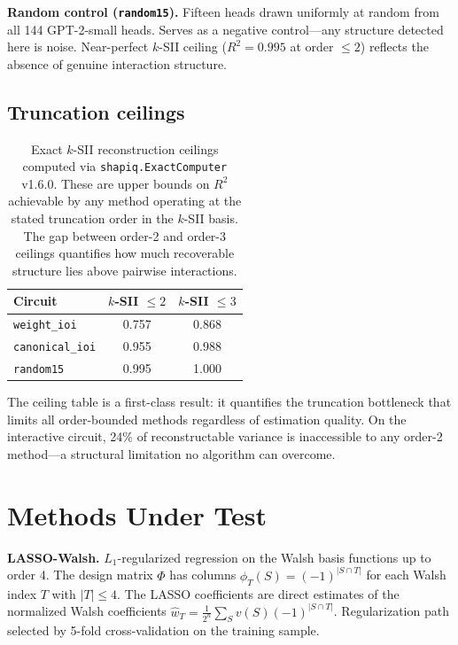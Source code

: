 \documentclass[11pt]{article}
\begin{document}
\textbf{Random control (\texttt{random15}).}
Fifteen heads drawn uniformly at random from all 144 GPT-2-small heads.
Serves as a negative control---any structure detected here is noise.
Near-perfect $k$-SII ceiling ($R^2 = 0.995$ at order $\leq 2$) reflects
the absence of genuine interaction structure.

\subsection{Truncation ceilings}
\label{sec:ceilings}

\begin{table}[t]
\centering
\caption{Exact $k$-SII reconstruction ceilings computed via
\texttt{shapiq.ExactComputer} v1.6.0. These are upper bounds on $R^2$
achievable by any method operating at the stated truncation order in the
$k$-SII basis. The gap between order-2 and order-3 ceilings quantifies
how much recoverable structure lies above pairwise interactions.}
\label{tab:ceilings}
\begin{tabular}{lcc}
\toprule
Circuit & $k$-SII $\leq 2$ & $k$-SII $\leq 3$ \\
\midrule
\texttt{weight\_ioi} & 0.757 & 0.868 \\
\texttt{canonical\_ioi} & 0.955 & 0.988 \\
\texttt{random15} & 0.995 & 1.000 \\
\bottomrule
\end{tabular}
\end{table}

The ceiling table is a first-class result: it quantifies the truncation
bottleneck that limits all order-bounded methods regardless of estimation
quality. On the interactive circuit, 24\% of reconstructable variance
is inaccessible to any order-2 method---a structural limitation no
algorithm can overcome.


\section{Methods Under Test}
\label{sec:methods}


\textbf{LASSO-Walsh.}
$L_1$-regularized regression on the Walsh basis functions up to order 4.
The design matrix $\Phi$ has columns $\phi_T(S) = (-1)^{|S \cap T|}$
for each Walsh index $T$ with $|T| \leq 4$. The LASSO coefficients are
direct estimates of the normalized Walsh coefficients
$\hat{w}_T = \frac{1}{2^n} \sum_S v(S)(-1)^{|S \cap T|}$. Regularization
path selected by 5-fold cross-validation on the training sample.
\end{document}
